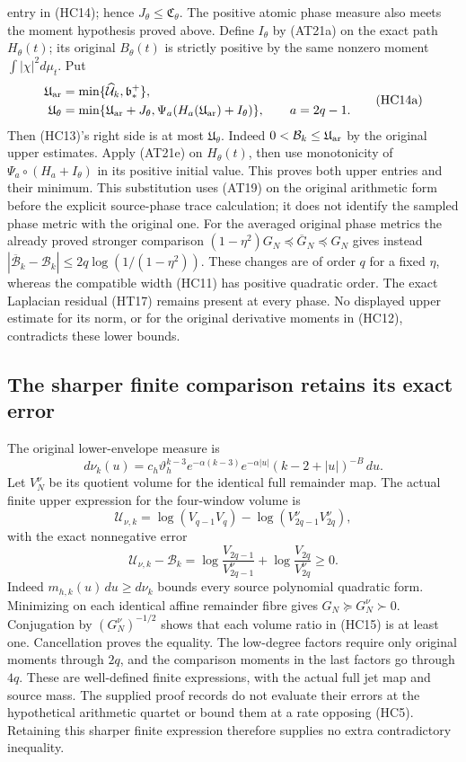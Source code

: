 entry in (HC14); hence $J_\theta\le\mathfrak C_\theta$.
The positive atomic phase measure also meets the moment hypothesis
proved above. Define $I_\theta$ by (AT21a) on the exact path
$H_\theta(t)$; its original $B_\theta(t)$ is strictly positive by
the same nonzero moment $\int|\chi|^2d\mu_t$. Put
\[
\begin{aligned}
\mathfrak U_{\rm ar}&=\min\{\widehat{\mathcal U}_k,\mathfrak b_*^+\},\\
\mathfrak U_\theta&=\min\{\mathfrak U_{\rm ar}+J_\theta,
 \Psi_a(H_a(\mathfrak U_{\rm ar})+I_\theta)\},\qquad a=2q-1.
\end{aligned}\tag{HC14a}
\]
Then (HC13)'s right side is at most $\mathfrak U_\theta$.
Indeed $0<\mathcal B_k\le\mathfrak U_{\rm ar}$ by the original
upper estimates. Apply (AT21e) on $H_\theta(t)$, then use
monotonicity of $\Psi_a\circ(H_a+I_\theta)$ in its positive
initial value. This proves both upper entries and their minimum.
This substitution uses (AT19) on the original arithmetic form
before the explicit source-phase trace calculation; it does not identify
the sampled phase metric with the original one.
For the averaged original phase metrics the already proved stronger
comparison $(1-\eta^2)G_N\preceq\overline G_N\preceq G_N$ gives instead
$|\overline{\mathcal B}_k-\mathcal B_k|
\leq2q\log(1/(1-\eta^2))$.  These changes are of order $q$ for a fixed
$\eta$, whereas the compatible width (HC11) has positive quadratic
order.  The exact Laplacian residual (HT17) remains present at every
phase.  No displayed upper estimate for its norm, or for the original
derivative moments in (HC12), contradicts these lower bounds.

\subsection{The sharper finite comparison retains its exact error}

The original lower-envelope measure is
\[
 d\nu_k(u)=c_h\vartheta_h^{k-3}e^{-\alpha(k-3)}
 e^{-\alpha|u|}(k-2+|u|)^{-B}\,du.
\]
Let $V_N^\nu$ be its quotient volume for the identical full remainder
map.  The actual finite upper expression for the four-window volume is
\[
 \mathcal U_{\nu,k}=\log(V_{q-1}V_q)
                  -\log(V_{2q-1}^\nu V_{2q}^\nu),
\]
with the exact nonnegative error
\[
 \boxed{
 \mathcal U_{\nu,k}-\mathcal B_k
 =\log\frac{V_{2q-1}}{V_{2q-1}^\nu}
  +\log\frac{V_{2q}}{V_{2q}^\nu}\geq0.}\tag{HC15}
\]
Indeed $m_{h,k}(u)\,du\geq d\nu_k$ bounds every source polynomial
quadratic form.  Minimizing on each identical affine remainder fibre
gives $G_N\succeq G_N^\nu\succ0$.  Conjugation by
$(G_N^\nu)^{-1/2}$ shows that each volume ratio in (HC15) is at least
one.  Cancellation proves the equality.  The low-degree factors require
only original moments through $2q$, and the comparison moments in the
last factors go through $4q$.  These are well-defined finite expressions,
with the actual full jet map and source mass.  The supplied proof
records do not evaluate their errors at the hypothetical arithmetic
quartet or bound them at a rate opposing (HC5).  Retaining this sharper
finite expression therefore supplies no extra contradictory inequality.
